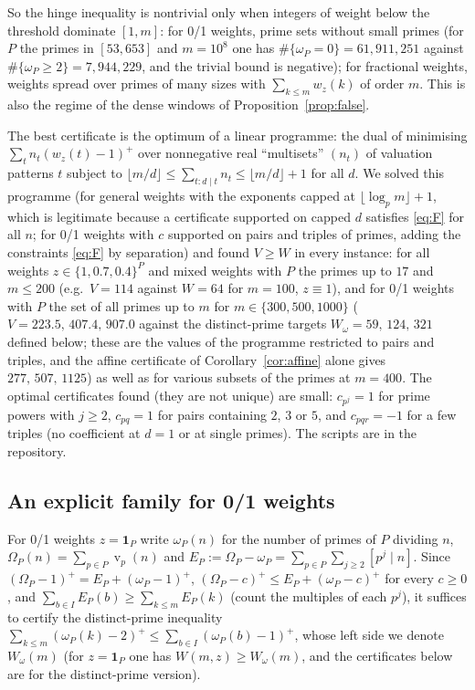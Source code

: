\documentclass[11pt]{article}
\theoremstyle{definition}
\DeclareMathOperator{\vp}{v}
\begin{document}
So the hinge inequality is nontrivial only when integers of weight below the threshold dominate $[1,m]$: for 0/1 weights, prime sets
without small primes (for $P$ the primes in $[53,653]$ and $m=10^8$ one has $\#\{\omega_P=0\}=61{,}911{,}251$ against
$\#\{\omega_P\ge2\}=7{,}944{,}229$, and the trivial bound is negative); for fractional weights, weights spread over primes of many sizes with
$\sum_{k\le m}w_z(k)$ of order $m$. This is also the regime of the dense windows of Proposition~\ref{prop:false}.

The best certificate is the optimum of a linear programme: the dual of minimising $\sum_t n_t(w_z(t)-1)^+$ over
nonnegative real ``multisets'' $(n_t)$ of valuation patterns $t$ subject to $\lfloor m/d\rfloor\le\sum_{t:d\mid t}n_t\le
\lfloor m/d\rfloor+1$ for all $d$. We solved this programme (for general weights with the exponents capped at
$\lfloor\log_pm\rfloor+1$, which is legitimate because a certificate supported on capped $d$ satisfies \eqref{eq:F} for all $n$; for 0/1 weights with $c$ supported on pairs and triples of primes, adding the constraints
\eqref{eq:F} by separation) and found $V\ge W$ in every instance: for all weights $z\in\{1,0.7,0.4\}^P$ and mixed weights
with $P$ the primes up to $17$ and $m\le200$ (e.g.\ $V=114$ against $W=64$ for $m=100$, $z\equiv1$), and for 0/1 weights
with $P$ the set of all primes up to $m$ for $m\in\{300,500,1000\}$ ($V=223.5,\,407.4,\,907.0$ against the distinct-prime
targets $W_\omega=59,\,124,\,321$ defined below; these are the values of the programme restricted to pairs and triples, and the affine
certificate of Corollary~\ref{cor:affine} alone gives $277,\,507,\,1125$)
as well as for various subsets of the primes at $m=400$. The optimal certificates found (they are not unique) are small: $c_{p^j}=1$ for prime powers with $j\ge2$,
$c_{pq}=1$ for pairs containing $2$, $3$ or $5$, and $c_{pqr}=-1$ for a few triples (no coefficient at $d=1$ or at single primes). The scripts are in the repository.

\subsection*{An explicit family for 0/1 weights}

For 0/1 weights $z=\mathbf 1_P$ write $\omega_P(n)$ for the number of primes of $P$ dividing $n$, $\Omega_P(n)=\sum_{p\in P}\vp_p(n)$
and $E_P:=\Omega_P-\omega_P=\sum_{p\in P}\sum_{j\ge2}[p^j\mid n]$. Since $(\Omega_P-1)^+=E_P+(\omega_P-1)^+$,
$(\Omega_P-c)^+\le E_P+(\omega_P-c)^+$ for every $c\ge0$, and $\sum_{b\in I}E_P(b)\ge\sum_{k\le m}E_P(k)$ (count the multiples
of each $p^j$), it suffices to certify the distinct-prime inequality $\sum_{k\le m}(\omega_P(k)-2)^+\le\sum_{b\in I}(\omega_P(b)-1)^+$, whose
left side we denote $W_\omega(m)$ (for $z=\mathbf 1_P$ one has $W(m,z)\ge W_\omega(m)$, and the certificates below are for the
distinct-prime version).
\end{document}

